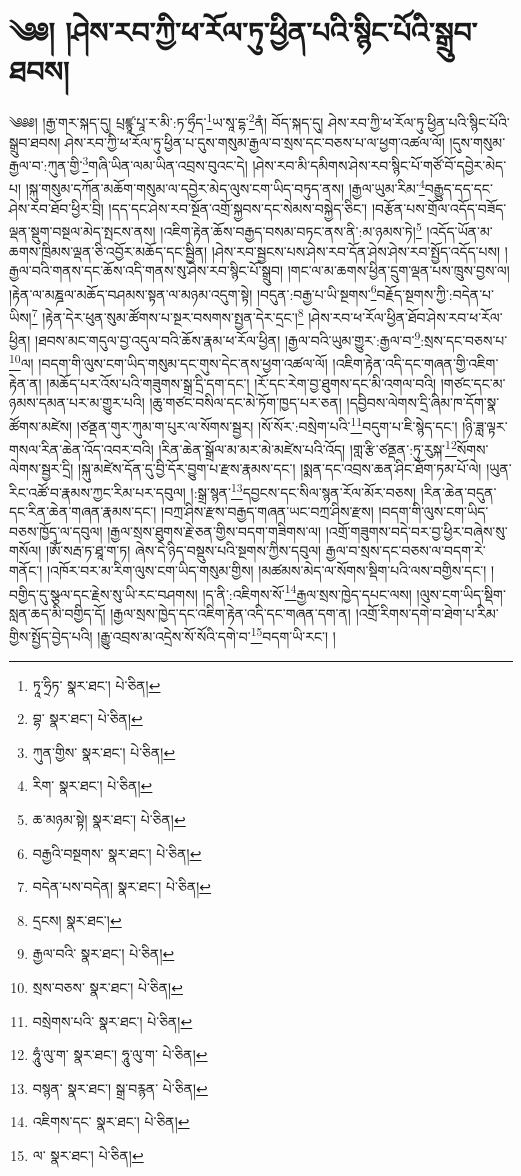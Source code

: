 \setcounter{footnote}{0} 
\chapter{༄༅། །ཤེས་རབ་ཀྱི་ཕ་རོལ་ཏུ་ཕྱིན་པའི་སྙིང་པོའི་སྒྲུབ་ཐབས།}༄༅༅། །རྒྱ་གར་སྐད་དུ། པྲཛྙཱ་པཱ་ར་མི་:ཏ་ཧྲྀད་\footnote{ཏཱ་ཧྲིཏ་  སྣར་ཐང་།  པེ་ཅིན། }ཡ་སཱ་དྷ་\footnote{བྷ་  སྣར་ཐང་།  པེ་ཅིན། }ནཾ། བོད་སྐད་དུ། ཤེས་རབ་ཀྱི་ཕ་རོལ་ཏུ་ཕྱིན་པའི་སྙིང་པོའི་སྒྲུབ་ཐབས། ཤེས་རབ་ཀྱི་ཕ་རོལ་ཏུ་ཕྱིན་པ་དུས་གསུམ་རྒྱལ་བ་སྲས་དང་བཅས་པ་ལ་ཕྱག་འཚལ་ལོ། །དུས་གསུམ་རྒྱལ་བ་:ཀུན་གྱི་\footnote{ཀུན་གྱིས་  སྣར་ཐང་།  པེ་ཅིན། }གཞི་ཡིན་ལམ་ཡིན་འབྲས་བུའང་དེ། །ཤེས་རབ་མི་དམིགས་ཤེས་རབ་སྙིང་པོ་གཙོ་བོ་དབྱེར་མེད་པ། །སྐུ་གསུམ་དཀོན་མཆོག་གསུམ་ལ་དབྱེར་མེད་ལུས་ངག་ཡིད་བཏུད་ནས། །རྒྱལ་ཡུམ་རིམ་\footnote{རིག་  སྣར་ཐང་།  པེ་ཅིན། }བརྒྱུད་དད་དང་ཤེས་རབ་ཐོབ་ཕྱིར་བྲི། །དད་དང་ཤེས་རབ་སྔོན་འགྲོ་སྐྱབས་དང་སེམས་བསྐྱེད་ཅིང་། །བརྩོན་པས་གྲོལ་འདོད་བཟོད་ལྡན་སྡུག་བསྔལ་མེད་སྤངས་ནས། །འཇིག་རྟེན་ཆོས་བརྒྱད་བསམ་བཏང་ནས་ནི་:མ་ཉམས་ཏེ།\footnote{ཆ་མཉམ་སྟེ།  སྣར་ཐང་།  པེ་ཅིན། } །འདོད་ཡོན་མ་ཆགས་ཁྲིམས་ལྡན་ཅི་འབྱོར་མཆོད་དང་སྦྱིན། །ཤེས་རབ་སྦྱངས་པས་ཤེས་རབ་དོན་ཤེས་ཤེས་རབ་སྤྱོད་འདོད་པས། །རྒྱལ་བའི་གནས་དང་ཆོས་འདི་གནས་སུ་ཤེས་རབ་སྙིང་པོ་སྒྲུབ། །གང་ལ་མ་ཆགས་ཕྱིན་དྲུག་ལྡན་པས་ཁྲུས་བྱས་ལ། །རྟེན་ལ་མཎྜལ་མཆོད་བཤམས་སྟན་ལ་མཉམ་འདུག་སྟེ། །བདུན་:བརྒྱ་པ་ཡི་སྔགས་\footnote{བརྒྱའི་བསྔགས་  སྣར་ཐང་།  པེ་ཅིན། }བརྗོད་སྔགས་ཀྱི་:བདེན་པ་ཡིས།\footnote{བདེན་པས་བདེན།  སྣར་ཐང་།  པེ་ཅིན། } །རྟེན་དེར་ཕུན་སུམ་ཚོགས་པ་སྔར་བསགས་སྤྱན་དེར་དྲང་།\footnote{དྲངས།  སྣར་ཐང་། } །ཤེས་རབ་ཕ་རོལ་ཕྱིན་ཐོབ་ཤེས་རབ་ཕ་རོལ་ཕྱིན། །ཐབས་མང་གདུལ་བྱ་འདུལ་བའི་ཆོས་རྣམ་ཕ་རོལ་ཕྱིན། །རྒྱལ་བའི་ཡུམ་གྱུར་:རྒྱལ་བ་\footnote{རྒྱལ་བའི་  སྣར་ཐང་།  པེ་ཅིན། }:སྲས་དང་བཅས་པ་\footnote{སྲས་བཅས་  སྣར་ཐང་།  པེ་ཅིན། }ལ། །བདག་གི་ལུས་ངག་ཡིད་གསུམ་དང་གུས་དེང་ནས་ཕྱག་འཚལ་ལོ། །འཇིག་རྟེན་འདི་དང་གཞན་གྱི་འཇིག་རྟེན་ན། །མཆོད་པར་འོས་པའི་གཟུགས་སྒྲ་དྲི་དག་དང་། །རོ་དང་རེག་བྱ་ཐུགས་དང་མི་འགལ་བའི། །གཙང་དང་མ་ཉམས་དམན་པར་མ་གྱུར་པའི། །ཆུ་གཙང་བསིལ་དང་མེ་ཏོག་ཁྱད་པར་ཅན། །དབྱིབས་ལེགས་དྲི་ཞིམ་ཁ་དོག་སྣ་ཚོགས་མཛེས། །ཙནྡན་གུར་ཀུམ་ག་པུར་ལ་སོགས་སྦྱར། །སོ་སོར་:བསྲེག་པའི་\footnote{བསྲེགས་པའི་  སྣར་ཐང་།  པེ་ཅིན། }བདུག་པ་ཇི་སྙེད་དང་། །ཉི་ཟླ་ལྟར་གསལ་རིན་ཆེན་འོད་འབར་བའི། །རིན་ཆེན་སྒྲོལ་མ་མར་མེ་མཛེས་པའི་འོད། །གླ་རྩི་ཙནྡན་:ཏུ་རུསྐ་\footnote{ཧཱུཾ་ལུ་ག་  སྣར་ཐང་། ཧཱུ་ལུ་ག་  པེ་ཅིན། }སོགས་ལེགས་སྦྱར་དྲི། །སྐུ་མཛེས་དོན་དུ་བྱི་དོར་བྱུག་པ་རྫས་རྣམས་དང་། །སྨན་དང་འབྲས་ཆན་ཤིང་ཐོག་ཏམ་པོ་ལེ། །ཡུན་རིང་འཚོ་བ་རྣམས་ཀྱང་རིམ་པར་དབུལ། །:སྒྲ་སྙན་\footnote{བསྙན་  སྣར་ཐང་། སྒྲ་བརྙན་  པེ་ཅིན། }དབྱངས་དང་སིལ་སྙན་རོལ་མོར་བཅས། །རིན་ཆེན་བདུན་དང་རིན་ཆེན་གཞན་རྣམས་དང་། །བཀྲ་ཤིས་རྫས་བརྒྱད་གཞན་ཡང་བཀྲ་ཤིས་རྫས། །བདག་གི་ལུས་ངག་ཡིད་བཅས་ཁྱོད་ལ་དབུལ། །རྒྱལ་སྲས་ཐུགས་རྗེ་ཅན་གྱིས་བདག་གཟིགས་ལ། །འགྲོ་གཟུགས་བདེ་བར་བྱ་ཕྱིར་བཞེས་སུ་གསོལ། །ཨོཾ་སརྦ་ཏ་ཐཱ་ག་ཏ། ཞེས་དེ་ཉིད་བསྡུས་པའི་སྔགས་ཀྱིས་དབུལ། རྒྱལ་བ་སྲས་དང་བཅས་ལ་བདག་རེ་གནོང་། །འཁོར་བར་མ་རིག་ལུས་ངག་ཡིད་གསུམ་གྱིས། །མཚམས་མེད་ལ་སོགས་སྡིག་པའི་ལས་བགྱིས་དང་། །བགྱིད་དུ་སྩལ་དང་རྗེས་སུ་ཡི་རང་བཤགས། །ད་ནི་:འཇིགས་སོ་\footnote{འཇིགས་དང་  སྣར་ཐང་།  པེ་ཅིན། }རྒྱལ་སྲས་ཁྱེད་དཔང་ལས། །ལུས་ངག་ཡིད་སྡིག་སླན་ཆད་མི་བགྱིད་དོ། །རྒྱལ་སྲས་ཁྱེད་དང་འཇིག་རྟེན་འདི་དང་གཞན་དག་ན། །འགྲོ་རིགས་དགེ་བ་ཐེག་པ་རིམ་གྱིས་སྤྱོད་བྱེད་པའི། །རྒྱུ་འབྲས་མ་འདྲེས་སོ་སོའི་དགེ་བ་\footnote{ལ་  སྣར་ཐང་།  པེ་ཅིན། }བདག་ཡི་རང་། །
